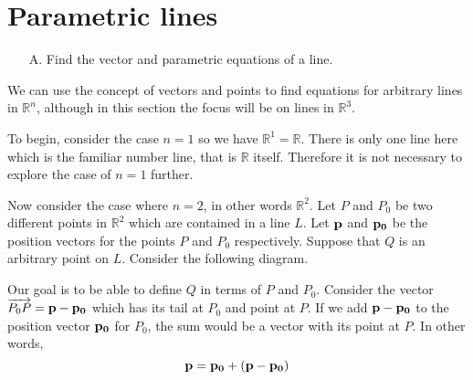\section{Parametric lines}

\begin{outcome}

\begin{enumerate}

\item[A.] Find the vector and parametric equations of a line.

\end{enumerate}
\end{outcome}

We can use the concept of vectors and points to find equations for arbitrary lines in $\mathbb{R}^n$, although in this section the focus will be on lines in $\mathbb{R}^3$. 

To begin, consider the case $n=1$ so we have $\mathbb{R}^{1}=\mathbb{R}$. There is only one line here which is the familiar number line, that is $\mathbb{R}$ itself. Therefore it is not necessary to explore the case of $n=1$ further. 

Now consider the case where $n=2$, in other words $\mathbb{R}^2$.  Let $P $ and $P_0$ be
two different points in $\mathbb{R}^{2}$ which are contained in a line
$L$. Let ${\bf p}$ and ${\bf p_0}$ be the position vectors for the points $P$ and $P_0$
respectively. Suppose that $Q$ is an arbitrary point on $L$. Consider the following
diagram.

\begin{center}
\end{center}

Our goal is to be able to define $Q$ in terms of $P$  and $P_0$. Consider the vector $\overrightarrow{P_0P} = {\bf p} - {\bf p_0}$ which
has its tail at $P_0$ and point at $P$. If we add ${\bf p} - {\bf p_0}$ to the position vector ${\bf p_0}$ for $P_0$,  
the sum would be a vector with its point at $P$. 
In other words,
\begin{equation*}
{\bf p} = {\bf p_0} + ({\bf p} - {\bf p_0})
\end{equation*}


